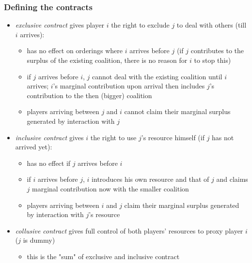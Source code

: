\documentclass[11pt,english]{beamer}
\begin{document}
\begin{frame}[allowframebreaks]\frametitle{Defining the contracts}
  \begin{itemize}
  \item \emph{exclusive contract} gives player $i$ the right to
    exclude $j$ to deal with others (till $i$ arrives):
    \begin{itemize}
    \item has no effect on orderings where $i$ arrives before $j$ (if
      $j$ contributes to the surplus of the existing coalition, there
      is no reason for $i$ to stop this)
    \item if $j$ arrives before $i$, $j$ cannot deal with the existing
      coalition until $i$ arrives; $i$'s marginal contribution upon
      arrival then includes $j$'s contribution to the then (bigger)
      coalition
    \item players arriving between $j$ and $i$ cannot claim their
      marginal surplus generated by interaction with $j$
    \end{itemize} %
  \item \emph{inclusive contract} gives $i$ the right to use $j$'s
    resource himself (if $j$ has not arrived yet):
    \begin{itemize}
    \item has no effect if $j$ arrives before $i$
    \item if $i$ arrives before $j$, $i$ introduces his own resource
      and that of $j$ and claims $j$ marginal contribution now with
      the smaller coalition
    \item players arriving between $i$ and $j$ claim their marginal
      surplus generated by interaction with $j$'s resource
    \end{itemize} %
  \item \emph{collusive contract} gives full control of both players'
    resources to proxy player $i$ ($j$ is dummy)
    \begin{itemize}
    \item this is the "sum" of exclusive and inclusive contract
    \end{itemize} %
  \end{itemize} %
\end{frame}
\end{document}
